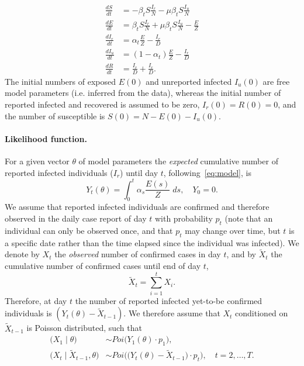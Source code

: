 \documentclass[12pt]{extarticle}
\begin{document}
{\begin{equation} \label{eq:model}
\begin{aligned}
\frac{dS}{dt} & = -\beta_t S \frac{I_r}{N} - \mu \beta_t S \frac{I_u}{N} \\
\frac{dE}{dt} & = \beta_t S \frac{I_r}{N} + \mu \beta_t S \frac{I_u}{N}  - \frac{E}{Z} \\
\frac{dI_r}{dt} & = \alpha_t \frac{E}{Z} - \frac{I_r}{D} \\
\frac{dI_u}{dt} & = (1-\alpha_t) \frac{E}{Z} - \frac{I_r}{D} \\
\frac{dR}{dt} & = \frac{I_r}{D} + \frac{I_r}{D} .
\end{aligned}
\end{equation}
The initial numbers of exposed $E(0)$ and unreported infected $I_u(0)$ are free model parameters (i.e. inferred from the data), whereas the initial number of reported infected and recovered is assumed to be zero, $I_r(0)=R(0)=0$, and the number of susceptible is $S(0)=N-E(0)-I_u(0)$.



\paragraph*{Likelihood function.}

For a given vector $\theta$ of model parameters the \emph{expected} cumulative number of reported infected individuals ($I_r$) until day $t$, following~\autoref{eq:model}, is
\begin{equation} \label{eq:Yt}
Y_t(\theta) = \int_{0}^{t}{\alpha_s \frac{E(s)}{Z} \; ds}, \quad Y_0 = 0.
\end{equation}
We assume that reported infected individuals are confirmed and therefore observed in the daily case report of day $t$ with probability $p_t$ (note that an individual can only be observed once, and that $p_t$ may change over time, but $t$ is a specific date rather than the time elapsed since the individual was infected).
We denote by $X_t$ the \emph{observed} number of confirmed cases in day $t$, and by $\tilde{X}_t$ the cumulative number of confirmed cases until end of day $t$,
\begin{equation} \label{eq:Xsumt}
\tilde{X}_t=\sum_{i=1}^{t}X_i.
\end{equation}
Therefore, at day $t$ the number of reported infected yet-to-be confirmed individuals is
$(Y_t(\theta) - \tilde{X}_{t-1})$.
We therefore assume that $X_t$ conditioned on $\tilde{X}_{t-1}$ is Poisson distributed, such that
\begin{equation} \label{eq:Xt} \begin{aligned}
\Big(X_1 \mid \theta \Big) & \sim \mathit{Poi}\big( Y_1(\theta) \cdot p_1 \big), \\
\Big(X_t \mid \tilde{X}_{t-1}, \theta \Big) & \sim 
\mathit{Poi}\Big( \big(Y_t(\theta) - \tilde{X}_{t-1}\big) \cdot p_t \Big), \quad t=2,\ldots,T.
\end{aligned}\end{equation}

}
\end{document}
